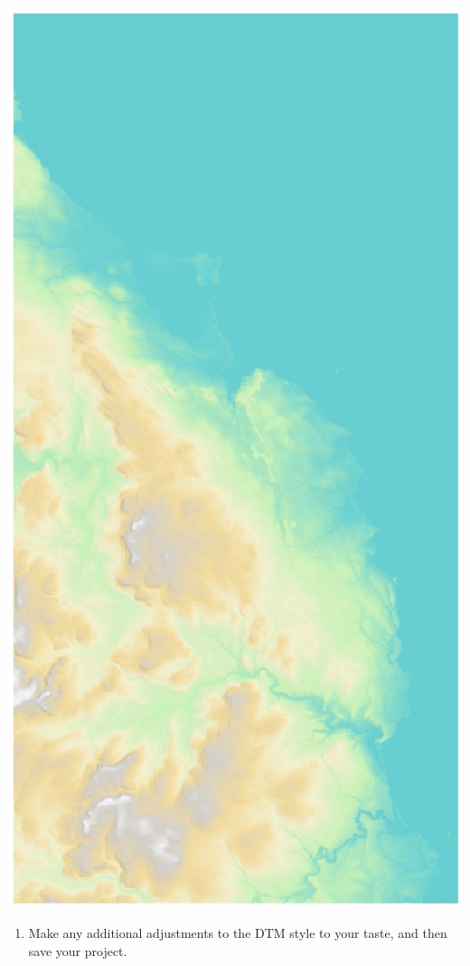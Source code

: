 \documentclass[
  letterpaper,
  DIV=11,
  numbers=noendperiod]{scrreprt}
\providecommand{\tightlist}{%
  \setlength{\itemsep}{0pt}\setlength{\parskip}{0pt}}\usepackage{longtable,booktabs,array}
\begin{document}
\includegraphics{images/lab_7/lab7_fig7_hillshade.jpg}

\begin{enumerate}
\def\labelenumi{(\arabic{enumi})}
\setcounter{enumi}{204}
\tightlist
\item
  Make any additional adjustments to the DTM style to your taste, and
  then save your project.
\end{enumerate}
\end{document}
